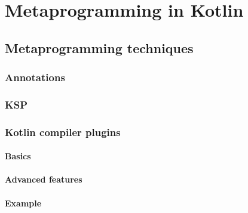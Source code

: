 \chapter{Metaprogramming in Kotlin}\label{chapter:metaprogramming}

\section{Metaprogramming techniques}
\subsection{Annotations}
\subsection{KSP}
\subsection{Kotlin compiler plugins}
\subsubsection{Basics}
\subsubsection{Advanced features}
\subsubsection{Example}
